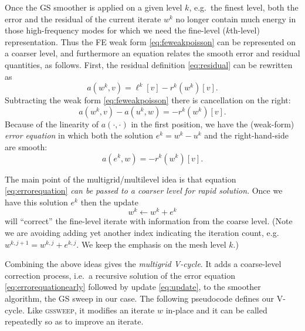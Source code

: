 \documentclass[letterpaper,final,12pt,reqno]{amsart}
\begin{document}
Once the GS smoother is applied on a given level $k$, e.g.~the finest level, both the error and the residual of the current iterate $w^k$ no longer contain much energy in those high-frequency modes for which we need the fine-level ($k$th-level) representation.  Thus the FE weak form \eqref{eq:feweakpoisson} can be represented on a coarser level, and furthermore an equation relates the smooth error and residual quantities, as follows.  First, the residual definition \eqref{eq:residual} can be rewritten as
\begin{equation}
  a(w^k,v) = \ell^k[v] - r^k(w^k)[v].  \label{eq:residualrewrite}
\end{equation}
Subtracting the weak form \eqref{eq:feweakpoisson} there is cancellation on the right:
\begin{equation}
  a(w^k,v) - a(u^k,w) = - r^k(w^k)[v].  \label{eq:errorequationearly}
\end{equation}
Because of the linearity of $a(\cdot,\cdot)$ in the first position, we have the (weak-form) \emph{error equation} in which both the solution $e^k=w^k-u^k$ and the right-hand-side are smooth:
\begin{equation}
  a(e^k,w) = - r^k(w^k)[v].  \label{eq:errorequation}
\end{equation}

The main point of the multigrid/multilevel idea is that equation \eqref{eq:errorequation} \emph{can be passed to a coarser level for rapid solution}.  Once we have this solution $e^k$ then the update
\begin{equation}
  w^k \gets w^k + e^k  \label{eq:update}
\end{equation}
will ``correct'' the fine-level iterate with information from the coarse level.  (Note we are avoiding adding yet another index indicating the iteration count, e.g.~$w^{k,j+1} = w^{k,j} + e^{k,j}$.  We keep the emphasis on the mesh level $k$.)

Combining the above ideas gives the \emph{multigrid V-cycle}.  It adds a coarse-level correction process, i.e.~a recursive solution of the error equation \eqref{eq:errorequationearly} followed by update \eqref{eq:update}, to the smoother algorithm, the GS sweep in our case.  The following pseudocode defines our V-cycle.  Like \textsc{gssweep}, it modifies an iterate $w$ in-place and it can be called repeatedly so as to improve an iterate.
\end{document}

